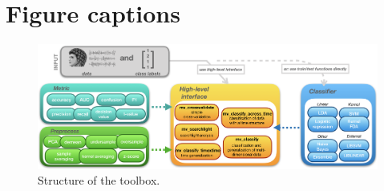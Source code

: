 \documentclass[utf8]{frontiersSCNS} %
\begin{document}



\section*{Figure captions}



\begin{figure}[ht!]
\centering\includegraphics[width=\linewidth]{fig1_MVPA_structure}
\caption{Structure of the toolbox.}\label{fig:structure}
\end{figure}
\end{document}
